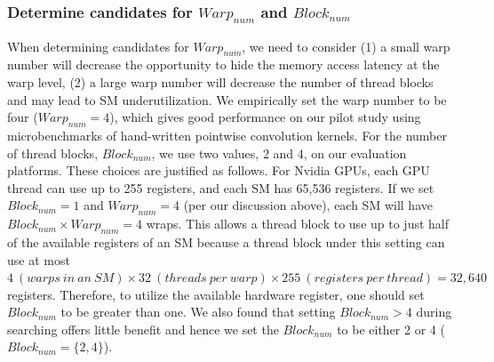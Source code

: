 \subsubsection{Determine candidates for $Warp_{num}$ and $Block_{num}$}
When determining candidates for $Warp_{num}$, we need to consider (1) a small warp number will decrease the opportunity to hide the memory access latency at the warp level, (2) a large warp number will decrease the number of thread blocks and may lead to SM underutilization. 
We empirically set the warp number to be four ($Warp_{num}=4$), which gives good performance on our pilot study using microbenchmarks of hand-written pointwise convolution kernels. 
For the number of thread blocks, $Block_{num}$, we use two values, 2 and 4, on our evaluation platforms. 
These choices are justified as follows. For Nvidia GPUs, each GPU thread can use up to 255 registers, and each SM has 65,536 registers. 
If we set $Block_{num}=1$ and $Warp_{num}=4$ (per our discussion above), each SM will have $Block_{num} \times Warp_{num}=4$ wraps. 
This allows a thread block to use up to just half of the available registers of an SM because a thread block under this setting can use at most $4\ (warps\ in\ an\ SM) \times 32\ (threads\ per\ warp) \times 255\ (registers\ per\ thread)=32,640$ registers. 
Therefore, to utilize the available hardware register, one should set $Block_{num}$ to be greater than one. 
We also found that setting $Block_{num}>4$ during searching offers little benefit and hence we set the $Block_{num}$ to be either 2 or 4 ($Block_{num}=\{2,4\}$).

